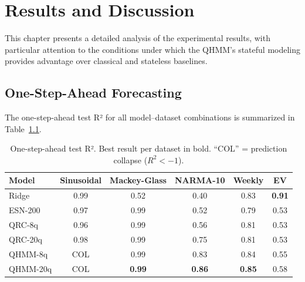 
\chapter{Results and Discussion}
\label{chap:results}

This chapter presents a detailed analysis of the experimental results,
with particular attention to the conditions under which the QHMM's
stateful modeling provides advantage over classical and stateless baselines.



\section{One-Step-Ahead Forecasting}
\label{sec:one_step}


The one-step-ahead test R² for all model--dataset combinations is
summarized in Table~\ref{tab:one_step_results}.


\begin{table}[htbp]
  \centering
  \caption{One-step-ahead test R². Best result per dataset in bold.
    ``COL'' = prediction collapse ($R^2 < -1$).}
  \label{tab:one_step_results}
  \begin{tabular}{@{}lccccc@{}}
    \toprule
    Model & Sinusoidal & Mackey-Glass & NARMA-10 & Weekly & EV \\
    \midrule
    Ridge & 0.99 & 0.52 & 0.40 & 0.83 & \textbf{0.91} \\
    ESN-200 & 0.97 & 0.99 & 0.52 & 0.79 & 0.53 \\
    QRC-8q & 0.96 & 0.99 & 0.56 & 0.81 & 0.53 \\
    QRC-20q & 0.98 & 0.99 & 0.75 & 0.81 & 0.53 \\
    QHMM-8q & COL & 0.99 & 0.83 & 0.84 & 0.55 \\
    QHMM-20q & COL & \textbf{0.99} & \textbf{0.86} & \textbf{0.85} & 0.58 \\
    \bottomrule
  \end{tabular}
\end{table}

